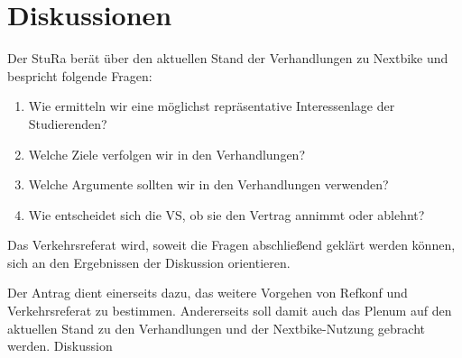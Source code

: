 \section{Diskussionen}

    {
    Der StuRa berät über den aktuellen Stand der Verhandlungen zu Nextbike und bespricht folgende Fragen:\\
    \begin{enumerate}
    \item Wie ermitteln wir eine möglichst repräsentative Interessenlage der Studierenden?
    \item Welche Ziele verfolgen wir in den Verhandlungen?
    \item Welche Argumente sollten wir in den Verhandlungen verwenden?
    \item Wie entscheidet sich die VS, ob sie den Vertrag annimmt oder ablehnt?
    \end{enumerate}
    Das Verkehrsreferat wird, soweit die Fragen abschließend geklärt werden können, sich an den Ergebnissen der Diskussion orientieren.
    }{
        Der Antrag dient einerseits dazu, das weitere Vorgehen von Refkonf und Verkehrsreferat zu bestimmen. Andererseits soll damit auch das Plenum auf den aktuellen Stand zu den Verhandlungen und der Nextbike-Nutzung gebracht werden.
    }{
        Diskussion
    }

